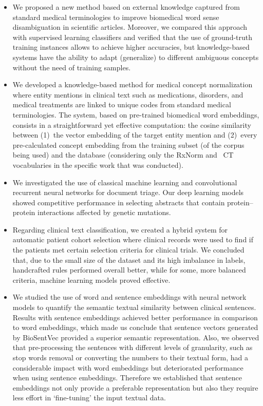 \begin{itemize}

\item
We proposed a new method based on external knowledge captured from standard medical terminologies to improve biomedical word sense disambiguation in scientific articles.
Moreover, we compared this approach with supervised learning classifiers and verified that the use of ground-truth training instances allows to achieve higher accuracies, but knowledge-based systems have the ability to adapt (generalize) to different ambiguous concepts without the need of training samples.

\item
We developed a knowledge-based method for medical concept normalization where entity mentions in clinical text such as medications, disorders, and medical treatments are linked to unique codes from standard medical terminologies.
The system, based on pre-trained biomedical word embeddings, consists in a straightforward yet effective computation: the cosine similarity between (1)~the vector embedding of the target entity mention and (2)~every pre-calculated concept embedding from the training subset (of the corpus being used) and the  database (considering only the RxNorm and ~CT vocabularies in the specific work that was conducted).

\item
We investigated the use of classical machine learning and convolutional recurrent neural networks for document triage.
Our deep learning models showed competitive performance in selecting  abstracts that contain protein--protein interactions affected by genetic mutations.

\item
Regarding clinical text classification, we created a hybrid system for automatic patient cohort selection where clinical records were used to find if the patients met certain selection criteria for clinical trials.
We concluded that, due to the small size of the dataset and its high imbalance in labels, handcrafted rules performed overall better, while for some, more balanced criteria, machine learning models proved effective.

\item
We studied the use of word and sentence embeddings with neural network models to quantify the semantic textual similarity between clinical sentences.
Results with sentence embeddings achieved better performance in comparison to word embeddings, which made us conclude that sentence vectors generated by BioSentVec \parencite{chen2019g} provided a superior semantic representation.
Also, we observed that pre-processing the sentences with different levels of granularity, such as stop words removal or converting the numbers to their textual form, had a considerable impact with word embeddings but deteriorated performance when using sentence embeddings.
Therefore we established that sentence embeddings not only provide a preferable representation but also they require less effort in `fine-tuning' the input textual data.


\end{itemize}
